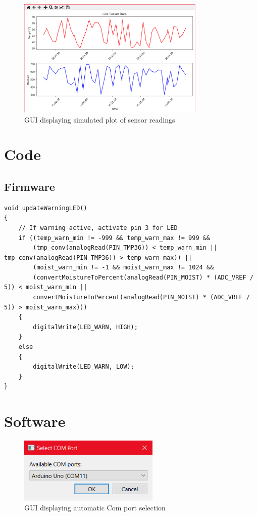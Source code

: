 \documentclass[a4paper,11pt]{article}
\begin{document}
\begin{figure}[H]
    \centering
    \includegraphics[width=0.8\textwidth]{Dummy Plotting.png}
    \caption{GUI displaying simulated plot of sensor readings}
    \label{fig:prelim_GUI_plot}
\end{figure}

\section{Code}
\subsection{Firmware}

\begin{lstlisting}[style=cpp-style, 
caption={LED warning light}, label={prog:LED}]
void updateWarningLED()
{
    // If warning active, activate pin 3 for LED
    if ((temp_warn_min != -999 && temp_warn_max != 999 &&
        (tmp_conv(analogRead(PIN_TMP36)) < temp_warn_min || tmp_conv(analogRead(PIN_TMP36)) > temp_warn_max)) ||
        (moist_warn_min != -1 && moist_warn_max != 1024 &&
        (convertMoistureToPercent(analogRead(PIN_MOIST) * (ADC_VREF / 5)) < moist_warn_min ||
        convertMoistureToPercent(analogRead(PIN_MOIST) * (ADC_VREF / 5)) > moist_warn_max)))
    {
        digitalWrite(LED_WARN, HIGH);
    }
    else
    {
        digitalWrite(LED_WARN, LOW);
    }
}
\end{lstlisting}

\section{Software}

\begin{figure}[H]
    \centering
    \includegraphics[width=0.6\textwidth]{1 - Select Comm Port.png}
    \caption{GUI displaying automatic Com port selection}
    \label{fig:port}
\end{figure}
\end{document}
